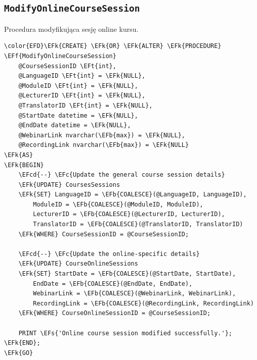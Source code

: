 \documentclass[11pt]{article}
\newcommand{\EFc}[1]{\textcolor{EFc}{\textit{#1}}} %
\newcommand{\EFcd}[1]{\textcolor{EFcd}{\textit{#1}}} %
\newcommand{\EFs}[1]{\textcolor{EFs}{#1}} %
\newcommand{\EFk}[1]{\textcolor{EFk}{\textbf{#1}}} %
\newcommand{\EFb}[1]{\textcolor{EFb}{\textbf{#1}}} %
\newcommand{\EFf}[1]{\textcolor{EFf}{#1}} %
\newcommand{\EFt}[1]{\textcolor{EFt}{\textbf{#1}}} %
\begin{document}
\subsection{\texttt{ModifyOnlineCourseSession}}
\label{sec:org5182aa8}
Procedura modyfikująca sesję online kursu.
\begin{Code}
\begin{Verbatim}
\color{EFD}\EFk{CREATE} \EFk{OR} \EFk{ALTER} \EFk{PROCEDURE} \EFf{ModifyOnlineCourseSession}
    @CourseSessionID \EFt{int},
    @LanguageID \EFt{int} = \EFk{NULL},
    @ModuleID \EFt{int} = \EFk{NULL},
    @LecturerID \EFt{int} = \EFk{NULL},
    @TranslatorID \EFt{int} = \EFk{NULL},
    @StartDate datetime = \EFk{NULL},
    @EndDate datetime = \EFk{NULL},
    @WebinarLink nvarchar(\EFb{max}) = \EFk{NULL},
    @RecordingLink nvarchar(\EFb{max}) = \EFk{NULL}
\EFk{AS}
\EFk{BEGIN}
    \EFcd{--} \EFc{Update the general course session details}
    \EFk{UPDATE} CoursesSessions
    \EFk{SET} LanguageID = \EFb{COALESCE}(@LanguageID, LanguageID),
        ModuleID = \EFb{COALESCE}(@ModuleID, ModuleID),
        LecturerID = \EFb{COALESCE}(@LecturerID, LecturerID),
        TranslatorID = \EFb{COALESCE}(@TranslatorID, TranslatorID)
    \EFk{WHERE} CourseSessionID = @CourseSessionID;

    \EFcd{--} \EFc{Update the online-specific details}
    \EFk{UPDATE} CourseOnlineSessions
    \EFk{SET} StartDate = \EFb{COALESCE}(@StartDate, StartDate),
        EndDate = \EFb{COALESCE}(@EndDate, EndDate),
        WebinarLink = \EFb{COALESCE}(@WebinarLink, WebinarLink),
        RecordingLink = \EFb{COALESCE}(@RecordingLink, RecordingLink)
    \EFk{WHERE} CourseOnlineSessionID = @CourseSessionID;

    PRINT \EFs{'Online course session modified successfully.'};
\EFk{END};
\EFk{GO}
\end{Verbatim}
\end{Code}
\end{document}
